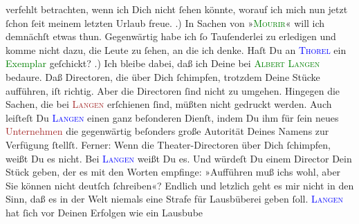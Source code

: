                verfehlt betrachten, wenn ich Dich nicht ſehen könnte, worauf ich mich nun jetzt
               ſchon ſeit meinem letzten Urlaub freue.\pend
           .) In Sachen von »\textsc{\textcolor{green}{Mourir}{}\ledrightnote{\textcolor{green}{Mourir. Roman}}}« will ich demnächſt etwas thun. Gegenwärtig habe ich ſo Tauſenderlei zu
               erledigen und komme nicht {\pb}dazu, die Leute zu ſehen,
               an die ich denke. Haſt Du an \textsc{\textcolor{blue}{Thorel}{}\ledrightnote{\textcolor{blue}{Jean Thorel}}} ein \textcolor{green}{Exemplar}{}
               geſchickt?\pend
           .) Ich bleibe dabei, daß ich Deine \label{K_L02774-3v}\label{K_L02774-3h} bei \textsc{\textcolor{brown}{\textcolor{green}{Albert Langen}{}}{}} bedaure.  Daß Directoren, die über Dich
               ſchimpfen, trotzdem Deine Stücke aufführen, iſt richtig. Aber die Directoren ſind
                  \strikeout{\textcolor{gray}{×}\-\textcolor{gray}{×}} nicht zu umgehen. Hingegen die Sachen, die bei \textsc{\textcolor{blue}{\textcolor{brown}{Langen}{}}{}\ledrightnote{\textcolor{blue}{Albert Langen}}} erſchienen ſind, müßten nicht  gedruckt
               werden.  Auch leiſteſt Du \textsc{\textcolor{blue}{Langen}{}\ledrightnote{\textcolor{blue}{Albert Langen}}}{ } einen ganz beſonderen Dienſt, indem Du ihm für ſein neues \textcolor{brown}{Unternehmen}{} die gegenwärtig {\pb}beſonders große Autorität Deines Namens zur
               Verfügung  ſtellſt. Ferner: Wenn die
               Theater-Directoren über Dich ſchimpfen, weißt Du es nicht. Bei \textsc{\textcolor{blue}{Langen}{}\ledrightnote{\textcolor{blue}{Albert Langen}}} weißt Du es. Und würdeſt Du einem Director Dein Stück geben, der es mit den
               Worten empfinge: »Aufführen muß ichs wohl, aber Sie können nicht deutſch ſchreiben«?
               Endlich und letzlich geht es mir nicht in den Sinn, daß es in der Welt niemals eine
               Strafe für Lausbüberei geben ſoll. \textsc{\textcolor{blue}{Langen}{}\ledrightnote{\textcolor{blue}{Albert Langen}}} hat ſich vor {\pb}Deinen Erfolgen wie ein Lausbube
